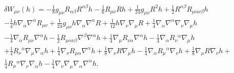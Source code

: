 \begin{eqnarray}
&&\delta W_{\mu\nu}(h)=- \tfrac{1}{8} g_{\mu \nu} R_{\alpha \beta} R^{\alpha \beta} h -  \tfrac{1}{6} R_{\mu \nu} R h + \tfrac{1}{24} g_{\mu \nu} R^2 h + \tfrac{1}{2} R^{\alpha \beta} R_{\mu \alpha \nu \beta} h
\nonumber\\
&& -  \tfrac{1}{4} h \nabla_{\alpha}\nabla^{\alpha}R_{\mu \nu} + \tfrac{1}{24} g_{\mu \nu} h \nabla_{\alpha}\nabla^{\alpha}R 
+ \tfrac{1}{12} h \nabla_{\nu}\nabla_{\mu}R
+\tfrac{1}{4} \nabla_{\alpha}\nabla^{\alpha}\nabla_{\nu}\nabla_{\mu}h
\nonumber\\
&& -  \tfrac{1}{4} \nabla_{\alpha}R_{\mu \nu} \nabla^{\alpha}h -  \tfrac{1}{2} R_{\mu \alpha \nu \beta} \nabla^{\beta}\nabla^{\alpha}h + \tfrac{1}{4} \nabla_{\mu}R_{\nu \alpha}\nabla^{\alpha}h  -  \tfrac{1}{4} \nabla_{\alpha}R_{\nu}{}^{\alpha} \nabla_{\mu}h
\nonumber\\
&& + \tfrac{1}{4} R_{\nu}{}^{\alpha} \nabla_{\mu}\nabla_{\alpha}h
 + \tfrac{1}{4} \nabla_{\nu}R_{\mu \alpha} \nabla^{\alpha}h + \tfrac{1}{8} \nabla_{\nu}R\nabla_{\mu}h  -  \tfrac{1}{4} \nabla_{\alpha}R_{\mu}{}^{\alpha} \nabla_{\nu}h + \tfrac{1}{8} \nabla_{\mu}R \nabla_{\nu}h +
 \nonumber\\
 && \tfrac{1}{4} R_{\mu}{}^{\alpha} \nabla_{\nu}\nabla_{\alpha}h  
-  \tfrac{1}{4} \nabla_{\nu}\nabla_{\mu}\nabla_{\alpha}\nabla^{\alpha}h.
\label{AP45}
\end{eqnarray}
%
